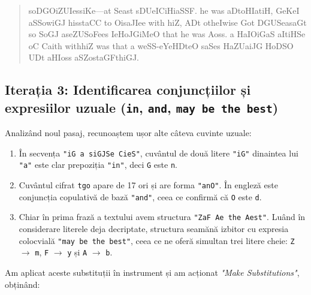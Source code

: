 \documentclass{labreport}
\begin{document}
\begin{quote}
soDGOiZUIessiKe---at Seast sDUeICiHiaSSF. he was aDtoHIatiH, GeKeI aSSowiGJ hisstaCC to OisaJIee with hiZ, ADt otheIwise Got DGUSeasaGt so SoGJ aseZUSoFees IeHoJGiMeO that he was Aoss. a HaIOiGaS aItiHSe oC Caith withhiZ was that a weSS-eYeHDteO saSes HaZUaiJG HoDSO UDt aHIoss aSZostaGFthiGJ.
\end{quote}

\subsection{Iterația 3: Identificarea conjuncțiilor și expresiilor uzuale (\texttt{in}, \texttt{and}, \texttt{may be the best})}

Analizând noul pasaj, recunoaștem ușor alte câteva cuvinte uzuale:
\begin{enumerate}[leftmargin=*]
    \item În secvența \texttt{"iG a siGJSe CieS"}, cuvântul de două litere \texttt{"iG"} dinaintea lui \texttt{"a"} este clar prepoziția \texttt{"in"}, deci \texttt{G} este \texttt{n}.
    \item Cuvântul cifrat \texttt{tgo} apare de 17 ori și are forma \texttt{"anO"}. În engleză este conjuncția copulativă de bază \texttt{"and"}, ceea ce confirmă că \texttt{O} este \texttt{d}.
    \item Chiar în prima frază a textului avem structura \texttt{"ZaF Ae the Aest"}. Luând în considerare literele deja decriptate, structura seamănă izbitor cu expresia colocvială \texttt{"may be the best"}, ceea ce ne oferă simultan trei litere cheie: \texttt{Z} $\to$ \texttt{m}, \texttt{F} $\to$ \texttt{y} și \texttt{A} $\to$ \texttt{b}.
\end{enumerate}

Am aplicat aceste substituții în instrument și am acționat \textit{"Make Substitutions"}, obținând:
\end{document}
